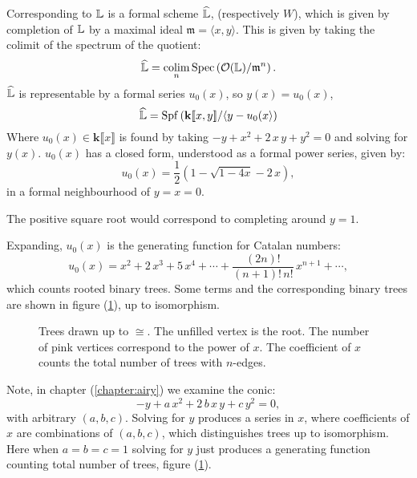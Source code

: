     Corresponding to \(\mathbb{L} \) is a formal scheme \( \widehat{\mathbb{L} \hspace{0pt} } \), (respectively \(W\)), which is given by completion of \(\mathbb{L} \) by a maximal ideal \( \mathfrak{m}=\langle x, y\rangle\). This is given by taking the colimit of the spectrum of the quotient: 
    \[ \widehat{\mathbb{L}} = \operatorname*{colim}_n  \mathrm{Spec} \left( \mathcal{O}(\mathbb{L} )/\mathfrak{m}^n \right). \]
    \( \widehat{\mathbb{L}}\) is representable by a formal series \(u_0(x)\), so \( y(x) =u_0(x)\), 
    \[ \widehat{\mathbb{L}} = \mathrm{Spf} \left(\mathbf{k}[\![ x,y]\!] /\langle y - u_{0}(x \rangle \right)\] 
    Where  \( u_0(x) \in \mathbf{k}\lBrack x \rBrack\) is found by taking \( -y + x^2 + 2 \,x\, y + y^2 = 0 \) and solving for \(y(x)\). \(u_0(x)\) has a closed form, understood as a formal power series, given by: 
    \[ u_0(x) = \frac{1}{2}\left( 1 - \sqrt{1-4x} - 2 \, x \right),\]
    in a formal neighbourhood of \(y=x=0\). 
    \begin{rem}
    The positive square root would correspond to completing around \(y=1\).
    \end{rem}
    Expanding, \( u_0(x)\) is the generating function for Catalan numbers:
    \[ u_0(x) = x^2 + 2\, x^3 + 5 \,x^4 + \cdots + \frac{(2n)!}{(n+1)!\,n!} \, x^{n+1}  + \cdots,\]
    which counts rooted binary trees. Some terms and the corresponding binary trees are shown in figure (\ref{fig:catalantrees}), up to isomorphism.
    \begin{figure}[htbp]
        \centering
        
        \caption{Trees drawn up to \( \cong\). The unfilled vertex is the root. The number of pink vertices correspond to the power of \(x\). The coefficient of \(x\) counts the total number of trees with \(n\)-edges.}
        \label{fig:catalantrees}
    \end{figure}
    
    
    \begin{rem}
    Note, in chapter (\ref{chapter:airy}) we examine the conic:
    \[ - y + a \,x^2 + 2\, b\, x \,y + c\, y^2 = 0,\] 
    with arbitrary \((a,b,c)\). Solving for \(y\) produces a series in \(x\), where coefficients of \(x\) are combinations of \((a,b,c)\), which distinguishes trees up to isomorphism. Here when \(a=b=c=1\) solving for \(y\) just produces a generating function counting total number of trees, figure (\ref{fig:catalantrees}).
    \end{rem}
    
